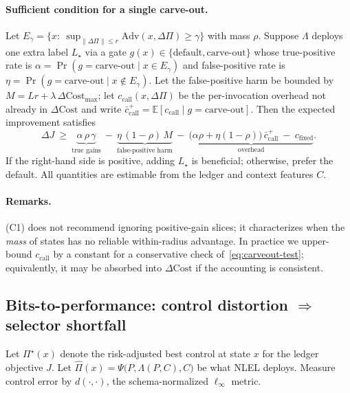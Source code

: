 \documentclass{article}
\theoremstyle{plain}
\theoremstyle{definition}
\theoremstyle{remark}
\begin{document}
\paragraph{Sufficient condition for a single carve-out.}
Let $E_\gamma=\{x:\ \sup_{\|\Delta\Pi\|\le r}\mathrm{Adv}(x,\Delta\Pi)\ge \gamma\}$ with mass $\rho$. 
Suppose $\Lambda$ deploys one extra label $L_\star$ via a gate $g(x)\in\{\text{default},\text{carve-out}\}$ whose true-positive rate is $\alpha=\Pr(g=\text{carve-out}\mid x\in E_\gamma)$ and false-positive rate is $\eta=\Pr(g=\text{carve-out}\mid x\notin E_\gamma)$. 
Let the false-positive harm be bounded by $M=Lr+\lambda\,\Delta\mathrm{Cost}_{\max}$; let $c_{\text{call}}(x,\Delta\Pi)$ be the per-invocation overhead not already in $\Delta\mathrm{Cost}$ and write $\bar c_{\text{call}}^{+}=\mathbb{E}[c_{\text{call}}\mid g=\text{carve-out}]$. 
Then the expected improvement satisfies
\begin{equation}
\Delta J\ \ge\ \underbrace{\alpha\,\rho\,\gamma}_{\text{true gains}}
\ -\ \underbrace{\eta\,(1-\rho)\,M}_{\text{false-positive harm}}
\ -\ \underbrace{\big(\alpha\rho+\eta(1-\rho)\big)\,\bar c_{\text{call}}^{+}\ -\ c_{\text{fixed}}}_{\text{overhead}}.
\label{eq:carveout-test}
\end{equation}
If the right-hand side is positive, adding $L_\star$ is beneficial; otherwise, prefer the default. 
All quantities are estimable from the ledger and context features $C$.

\paragraph{Remarks.}
(C1) does not recommend ignoring positive-gain slices; it characterizes when the \emph{mass} of states has no reliable within-radius advantage. 
In practice we upper-bound $c_{\text{call}}$ by a constant for a conservative check of~\eqref{eq:carveout-test}; equivalently, it may be absorbed into $\Delta\mathrm{Cost}$ if the accounting is consistent.

\subsection{Bits-to-performance: control distortion $\Rightarrow$ selector shortfall}

Let $\Pi^\star(x)$ denote the risk-adjusted best control at state $x$ for the ledger objective $J$. 
Let $\widehat{\Pi}(x)=\Psi\big(P,\Lambda(P,C),C\big)$ be what NLEL deploys. 
Measure control error by $d(\cdot,\cdot)$, the schema-normalized $\ell_\infty$ metric.
\end{document}
